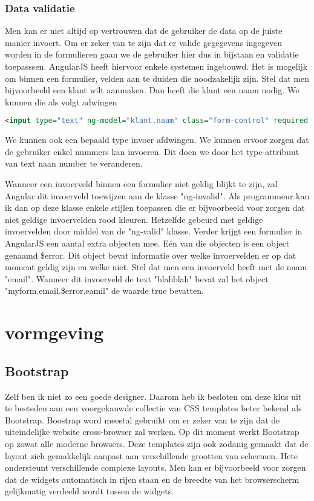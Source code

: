 \documentclass[a4paper,11pt]{article}
\begin{document}
\subsubsection{Data validatie}
Men kan er niet altijd op vertrouwen dat de gebruiker de data op de juiste manier invoert. Om er zeker van te zijn dat er valide gegegevens ingegeven worden in de formulieren gaan we de gebruiker hier dus in bijstaan en validatie toepasssen. AngularJS heeft hiervoor enkele systemen ingebouwd. Het is mogelijk om binnen een formulier, velden aan te duiden die noodzakelijk zijn. Stel dat men bijvoorbeeld een klant wilt aanmaken. Dan heeft die klant een naam nodig. We kunnen die als volgt adwingen
\begin{lstlisting}[language=html]
<input type="text" ng-model="klant.naam" class="form-control" required />
\end{lstlisting}

We kunnen ook een bepaald type invoer afdwingen. We kunnen ervoor zorgen dat de gebruiker enkel nummers kan invoeren. Dit doen we door het type-attribuut van text naan number te veranderen.

Wanneer een invoerveld binnen een formulier niet geldig blijkt te zijn, zal Angular dit invoerveld toewijzen aan de klasse "ng-invalid". Als programmeur kan ik dan op deze klasse enkele stijlen toepassen die er bijvoorbeeld voor zorgen dat niet geldige invoervelden rood kleuren. Hetzelfde gebeurd met geldige invoervelden door middel van de "ng-valid" klasse. Verder krijgt een formulier in AngularJS een aantal extra objecten mee. Eén van die objecten is een object genaamd \$error. Dit object bevat informatie over welke invoervelden er op dat moment geldig zijn en welke niet. Stel dat men een invoerveld heeft met de naam "email". Wanneer dit invoerveld de text "blahblah" bevat zal het object "myform.email.\$error.eamil" de waarde true bevatten.

\section{vormgeving}

\subsection{Bootstrap}
Zelf ben ik niet zo een goede designer. Daarom heb ik besloten om deze klus uit te besteden aan een voorgekauwde collectie van CSS templates beter bekend als Bootstrap. Boostrap word meestal gebruikt om er zeker van te zijn dat de uiteindelijke website cross-browser zal werken. Op dit moment werkt Bootstrap op zowat alle moderne browsers. Deze templates zijn ook zodanig gemaakt dat de layout zich gemakkelijk aanpast aan verschillende grootten van schermen. Hete ondersteunt verschillende complexe layouts. Men kan er bijvoorbeeld voor zorgen dat de widgets automatisch in rijen staan en de breedte van het browserscherm gelijkmatig verdeeld wordt tussen de widgets.
\end{document}
